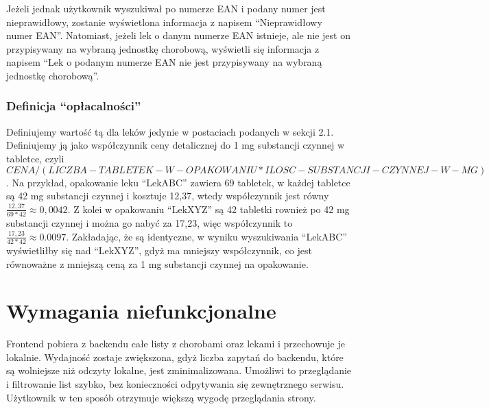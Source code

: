 \documentclass{article}
\begin{document}
      Jeżeli jednak użytkownik wyszukiwał po numerze EAN i podany numer jest nieprawidłowy, zostanie wyświetlona informacja z napisem ``Nieprawidłowy numer EAN''.
      Natomiast, jeżeli lek o danym numerze EAN istnieje, ale nie jest on przypisywany na wybraną jednostkę chorobową,
      wyświetli się informacja z napisem ``Lek o podanym numerze EAN nie jest przypisywany na wybraną jednostkę chorobową''.

      \subsubsection{Definicja ``opłacalności''}
      Definiujemy wartość tą dla leków jedynie w postaciach podanych w sekcji 2.1.
      Definiujemy ją jako współczynnik ceny detalicznej do 1 mg substancji czynnej w tabletce,
      czyli $CENA / (LICZBA-TABLETEK-W-OPAKOWANIU * ILOSC-SUBSTANCJI-CZYNNEJ-W-MG)$.
      Na przykład, opakowanie leku ``LekABC'' zawiera 69 tabletek, w każdej tabletce są 42 mg substancji czynnej i kosztuje 12,37,
      wtedy współczynnik jest równy $\frac{12,37}{69 * 42} \approx 0,0042$.
      Z kolei w opakowaniu ``LekXYZ'' są 42 tabletki rownież po 42 mg substancji czynnej i można go nabyć za 17,23,
      więc współczynnik to $\frac{17,23}{42 * 42} \approx 0.0097$.
      Zakładając, że są identyczne, w wyniku wyszukiwania ``LekABC'' wyświetliłby się nad ``LekXYZ'', gdyż ma mniejszy współczynnik,
      co jest równoważne z mniejszą ceną za 1 mg substancji czynnej na opakowanie.

  \section{Wymagania niefunkcjonalne}
  Frontend pobiera z backendu całe listy z chorobami oraz lekami i przechowuje je lokalnie.
  Wydajność zostaje zwiększona, gdyż liczba zapytań do backendu, które są wolniejsze niż odczyty lokalne, jest zminimalizowana.
  Umożliwi to przeglądanie i filtrowanie list szybko, bez konieczności odpytywania się zewnętrznego serwisu.
  Użytkownik w ten sposób otrzymuje większą wygodę przeglądania strony.
\end{document}

